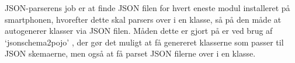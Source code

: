 JSON-parserens job er at finde JSON filen for hvert eneste modul installeret på smartphonen, hvorefter dette skal parsers over i en klasse, så på den måde at autogenerer klasser via JSON filen.
Måden dette er gjort på er ved brug af `jsonschema2pojo' \citep{jsonpojo}, der gør det muligt at få genereret klasserne som passer til JSON skemaerne, men også at få parset JSON filerne over i en klasse. 